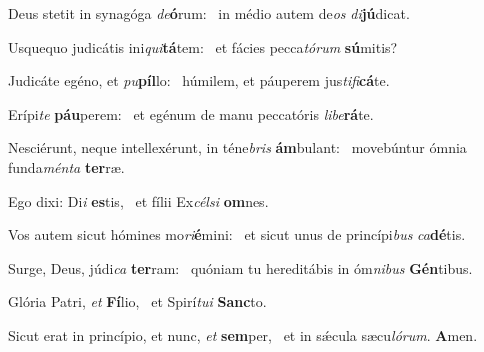\item Deus stetit in synagóga \textit{de}\textbf{ó}rum:~\psstar{} in médio autem de\textit{os} \textit{di}\textbf{jú}dicat.

\item Usquequo judicátis ini\textit{qui}\textbf{tá}tem:~\psstar{} et fácies pecca\textit{tórum} \textbf{sú}mitis?

\item Judicáte egéno, et \textit{pu}\textbf{píl}lo:~\psstar{} húmilem, et páuperem jus\textit{tifi}\textbf{cá}te.

\item Erípi\textit{te} \textbf{páu}perem:~\psstar{} et egénum de manu peccatóris \textit{libe}\textbf{rá}te.

\item Nesciérunt, neque intellexérunt, in téne\textit{bris} \textbf{ám}bulant:~\psstar{} movebúntur ómnia funda\textit{ménta} \textbf{ter}ræ.

\item Ego dixi: Di\textit{i} \textbf{es}tis,~\psstar{} et fílii Ex\textit{célsi} \textbf{om}nes.

\item Vos autem sicut hómines mo\textit{ri}\textbf{é}mini:~\psstar{} et sicut unus de princípi\textit{bus} \textit{ca}\textbf{dé}tis.

\item Surge, Deus, júdi\textit{ca} \textbf{ter}ram:~\psstar{} quóniam tu hereditábis in óm\textit{nibus} \textbf{Gén}tibus.

\item Glória Patri, \textit{et} \textbf{Fí}lio,~\psstar{} et Spirí\textit{tui} \textbf{Sanc}to.

\item Sicut erat in princípio, et nunc, \textit{et} \textbf{sem}per,~\psstar{} et in sǽcula sæcu\textit{lórum}. \textbf{A}men.